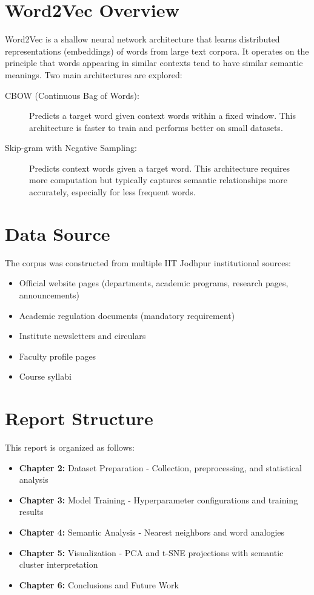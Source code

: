 \documentclass[11pt,a4paper]{report}
\begin{document}
\section{Word2Vec Overview}
Word2Vec is a shallow neural network architecture that learns distributed representations (embeddings) of words from large text corpora. It operates on the principle that words appearing in similar contexts tend to have similar semantic meanings. Two main architectures are explored:

\begin{description}
    \item[CBOW (Continuous Bag of Words):] Predicts a target word given context words within a fixed window. This architecture is faster to train and performs better on small datasets.
    \item[Skip-gram with Negative Sampling:] Predicts context words given a target word. This architecture requires more computation but typically captures semantic relationships more accurately, especially for less frequent words.
\end{description}

\section{Data Source}
The corpus was constructed from multiple IIT Jodhpur institutional sources:
\begin{itemize}
    \item Official website pages (departments, academic programs, research pages, announcements)
    \item Academic regulation documents (mandatory requirement)
    \item Institute newsletters and circulars
    \item Faculty profile pages
    \item Course syllabi
\end{itemize}

\section{Report Structure}
This report is organized as follows:
\begin{itemize}
    \item \textbf{Chapter 2:} Dataset Preparation - Collection, preprocessing, and statistical analysis
    \item \textbf{Chapter 3:} Model Training - Hyperparameter configurations and training results
    \item \textbf{Chapter 4:} Semantic Analysis - Nearest neighbors and word analogies
    \item \textbf{Chapter 5:} Visualization - PCA and t-SNE projections with semantic cluster interpretation
    \item \textbf{Chapter 6:} Conclusions and Future Work
\end{itemize}
\end{document}
